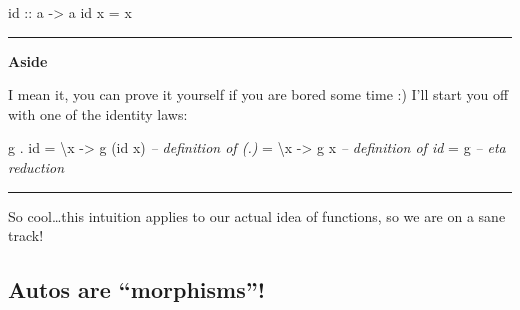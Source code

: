 \documentclass[]{article}
\newenvironment{Shaded}{}{}
\newcommand{\DecValTok}[1]{\textcolor[rgb]{0.25,0.63,0.44}{{#1}}}
\newcommand{\CommentTok}[1]{\textcolor[rgb]{0.38,0.63,0.69}{\textit{{#1}}}}
\newcommand{\OtherTok}[1]{\textcolor[rgb]{0.00,0.44,0.13}{{#1}}}
\newcommand{\FunctionTok}[1]{\textcolor[rgb]{0.02,0.16,0.49}{{#1}}}
\newcommand{\NormalTok}[1]{{#1}}
\begin{document}
\begin{Shaded}
\begin{Highlighting}[]
\NormalTok{id}\OtherTok{ ::} \NormalTok{a }\OtherTok{->} \NormalTok{a}
\NormalTok{id x }\FunctionTok{=} \NormalTok{x}
\end{Highlighting}
\end{Shaded}

\begin{Shaded}
\end{Shaded}

\begin{center}\rule{0.5\linewidth}{\linethickness}\end{center}

\textbf{Aside}

I mean it, you can prove it yourself if you are bored some time :) I'll
start you off with one of the identity laws:

\begin{Shaded}
\begin{Highlighting}[]
\NormalTok{g }\FunctionTok{.} \NormalTok{id }\FunctionTok{=} \NormalTok{\textbackslash{}x }\OtherTok{->} \NormalTok{g (id x)     }\CommentTok{-- definition of (.)}
       \FunctionTok{=} \NormalTok{\textbackslash{}x }\OtherTok{->} \NormalTok{g x          }\CommentTok{-- definition of id}
       \FunctionTok{=} \NormalTok{g                  }\CommentTok{-- eta reduction}
\end{Highlighting}
\end{Shaded}

\begin{center}\rule{0.5\linewidth}{\linethickness}\end{center}

So cool\ldots{}this intuition applies to our actual idea of functions,
so we are on a sane track!

\subsection{\texorpdfstring{Autos are
``morphisms''!}{Autos are morphisms!}}\label{autos-are-morphisms}
\end{document}
